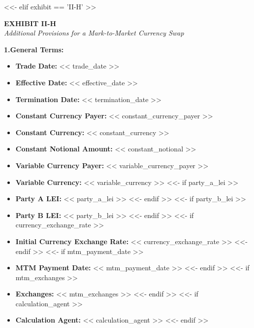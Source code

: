 \documentclass[11pt, a4paper]{article}
\begin{document}
<<- elif exhibit == 'II-H' >>
\begin{center}
    \textbf{EXHIBIT II-H} \\
    \textit{Additional Provisions for a Mark-to-Market Currency Swap}
\end{center}

\vspace{0.3cm}
\noindent \textbf{1.\quad General Terms:}
\begin{itemize}[leftmargin=2cm, label={}, itemsep=3pt]
    \item \textbf{Trade Date:} << trade_date >>
    \item \textbf{Effective Date:} << effective_date >>
    \item \textbf{Termination Date:} << termination_date >>
    \item \textbf{Constant Currency Payer:} << constant_currency_payer >>
    \item \textbf{Constant Currency:} << constant_currency >>
    \item \textbf{Constant Notional Amount:} << constant_notional >>
    \item \textbf{Variable Currency Payer:} << variable_currency_payer >>
    \item \textbf{Variable Currency:} << variable_currency >>
<<- if party_a_lei >>
    \item \textbf{Party A LEI:} << party_a_lei >>
<<- endif >>
<<- if party_b_lei >>
    \item \textbf{Party B LEI:} << party_b_lei >>
<<- endif >>
<<- if currency_exchange_rate >>
    \item \textbf{Initial Currency Exchange Rate:} << currency_exchange_rate >>
<<- endif >>
<<- if mtm_payment_date >>
    \item \textbf{MTM Payment Date:} << mtm_payment_date >>
<<- endif >>
<<- if mtm_exchanges >>
    \item \textbf{Exchanges:} << mtm_exchanges >>
<<- endif >>
<<- if calculation_agent >>
    \item \textbf{Calculation Agent:} << calculation_agent >>
<<- endif >>
\end{itemize}
\end{document}
